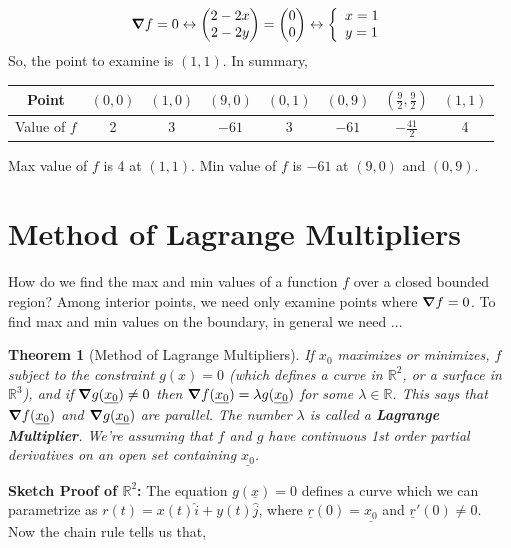 \documentclass{article}
\newtheorem{theorem}{Theorem}[section]
\newcommand{\n}{\leavevmode \newline} %
\newcommand{\R}{\mathbb{R}} %
\numberwithin{equation}{subsection} %
\begin{document}
\begin{equation}
    \begin{split}
        \grad f = 0 \leftrightarrow 
        \begin{pmatrix}
            2-2x \\ 2-2y
        \end{pmatrix} 
        = 
        \begin{pmatrix}
            0 \\ 0
        \end{pmatrix}
    \leftrightarrow
    \left\{
    \begin{array}{ll}
        x=1\\y=1
    \end{array}
    \right.
    \end{split}
\end{equation}
So, the point to examine is $(1,1)$. In summary, 

\begin{table}[H]
    \centering
    \begin{tabular}{c|c|c|c|c|c|c|c}
        Point & $(0,0)$ & $(1,0)$ & $(9,0)$ & $(0,1)$ & $(0,9)$ & $(\frac{9}{2},\frac{9}{2})$ & $(1,1)$ \\
        \hline
        Value of $f$ & 2 & 3 & $-61$ & 3 & $-61$ & $-\frac{41}{2}$ & 4 
    \end{tabular}
\end{table} \n
Max value of $f$ is 4 at $(1,1)$. Min value of $f$ is $-61$ at $(9,0)$ and $(0,9)$.
\section{Method of Lagrange Multipliers}
How do we find the max and min values of a function $f$ over a closed bounded region? Among interior points, we need only examine points where $\grad f = 0$. To find max and min values on the boundary, in general we need ...
\begin{theorem}[Method of Lagrange Multipliers]
If \underline{$x_0$} maximizes or minimizes, $f$ subject to the constraint $g(x)=0$ (which defines a curve in $\R^2$, or a surface in $\R^3$), and if $\grad g(\underline{x_0})\neq 0$ then $\grad f(\underline{x_0}) = \lambda g(\underline{x_0})$ for some $\lambda \in \R$. This says that $\grad f(\underline{x_0})$ and $\grad g(\underline{x_0})$ are parallel. The number $\lambda$ is called a \textbf{Lagrange Multiplier}. We're assuming that $f$ and $g$ have continuous 1st order partial derivatives on an open set containing $\underline{x_0}$.
\end{theorem} \n
\textbf{Sketch Proof of $\R^2$:} The equation $g(\underline{x}) = 0$ defines a curve which we can parametrize as $r(t)=x(t)\hat{i}+y(t)\hat{j}$, where $\underline{r}(0)=\underline{x_0}$ and $\underline{r}'(0)\neq 0$. Now the chain rule tells us that,
\end{document}
